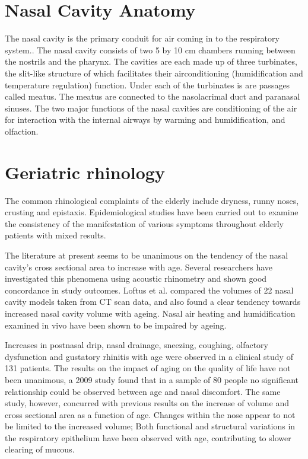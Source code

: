 \section{Nasal Cavity Anatomy}

The nasal cavity is the primary conduit for air coming in to the respiratory system.\cite{Elad2008}. The nasal cavity consists of two 5 by 10 cm chambers running between the nostrils and the pharynx\cite{Mygind1998}. The cavities are each made up of three turbinates, the slit-like structure of which facilitates their airconditioning (humidification and temperature regulation) function\cite{Mygind1998}. Under each of the turbinates is are passages called meatus. The meatus are connected to the nasolacrimal duct and paranasal sinuses\cite{Mygind1998}. The two major functions of the nasal cavities are conditioning of the air for interaction with the internal airways by warming and humidification, and olfaction\cite{Doorly2008, Elad2008, Mygind1998, Berglund1982}.

\section{Geriatric rhinology}
The common rhinological complaints of the elderly include dryness, runny noses, crusting and epistaxis\cite{Varga-Huettner2013}. Epidemiological studies have been carried out to examine the consistency of the manifestation of various symptoms throughout elderly patients with mixed results. 

The literature at present seems to be unanimous on the tendency of the nasal cavity's cross sectional area to increase with age. Several researchers have investigated this phenomena using acoustic rhinometry and shown good concordance in study outcomes\cite{Kalmovich2005, Edelstein1996,WhanKim2007,Lindemann2008}. Loftus et al. \cite{Loftus2016} compared the volumes of 22 nasal cavity models taken from CT scan data, and also found a clear tendency towards increased nasal cavity volume with ageing. Nasal air heating and humidification examined in vivo have been shown to be impaired by ageing\cite{Lindemann2008}. 

Increases in postnasal drip, nasal drainage, sneezing, coughing, olfactory dysfunction and gustatory rhinitis with age were observed in a clinical study of 131 patients\cite{Edelstein1996}. The results on the impact of aging on the quality of life have not been unanimous, a 2009 study found that in a sample of 80 people no significant relationship could be observed between age and nasal discomfort\cite{Lindemann2010}. The same study, however, concurred with previous results on the increase of volume and cross sectional area as a function of age. Changes within the nose appear to not be limited to the increased volume; Both functional and structural variations in the respiratory epithelium have been observed with age, contributing to slower clearing of mucous\cite{HO2001}. 

